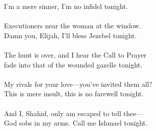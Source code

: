 \begin{Parallel}{0.48\textwidth}{0.48\textwidth}
{I’m a mere sinner, I’m no infidel tonight.\\
\-\ \\Executioners near the woman at the window.\\
Damn you, Elijah, I’ll bless Jezebel tonight.\\
\-\ \\The hunt is over, and I hear the Call to Prayer\\
fade into that of the wounded gazelle tonight.\\
\-\ \\My rivals for your love—you’ve invited them all?\\
This is mere insult, this is no farewell tonight.\\
\-\ \\And I, Shahid, only am escaped to tell thee—\\
God sobs in my arms. Call me Ishmael tonight.}
\ParallelPar
\end{Parallel}
\vfill
\hspace{0pt}